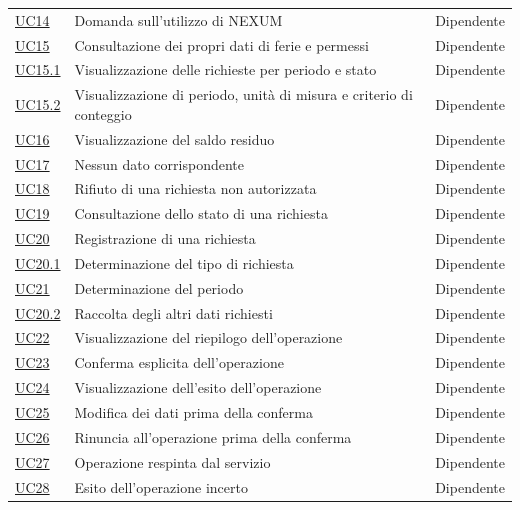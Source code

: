 \documentclass[documento]{gpt}
\begin{document}
{\begin{longtable}{@{}p{1.9cm}>{\raggedright\arraybackslash}p{8.7cm}>{\raggedright\arraybackslash}p{4.2cm}@{}}
\hyperref[uc:prodotto]{UC14} & Domanda sull'utilizzo di NEXUM & Dipendente \\
\hyperref[uc:dati]{UC15} & Consultazione dei propri dati di ferie e permessi & Dipendente \\
\hspace{1em}\hyperref[uc:dati_riep]{UC15.1} & Visualizzazione delle richieste per periodo e stato & Dipendente \\
\hspace{1em}\hyperref[uc:dati_criteri]{UC15.2} & Visualizzazione di periodo, unità di misura e criterio di conteggio & Dipendente \\
\hyperref[uc:saldo]{UC16} & Visualizzazione del saldo residuo & Dipendente \\
\hyperref[uc:nessun_dato]{UC17} & Nessun dato corrispondente & Dipendente \\
\hyperref[uc:non_aut]{UC18} & Rifiuto di una richiesta non autorizzata & Dipendente \\
\hyperref[uc:stato_rich]{UC19} & Consultazione dello stato di una richiesta & Dipendente \\
\hyperref[uc:registra]{UC20} & Registrazione di una richiesta & Dipendente \\
\hspace{1em}\hyperref[uc:reg_tipo]{UC20.1} & Determinazione del tipo di richiesta & Dipendente \\
\hyperref[uc:periodo]{UC21} & Determinazione del periodo & Dipendente \\
\hspace{1em}\hyperref[uc:reg_campi]{UC20.2} & Raccolta degli altri dati richiesti & Dipendente \\
\hyperref[uc:op_riep]{UC22} & Visualizzazione del riepilogo dell'operazione & Dipendente \\
\hyperref[uc:op_conf]{UC23} & Conferma esplicita dell'operazione & Dipendente \\
\hyperref[uc:op_esito]{UC24} & Visualizzazione dell'esito dell'operazione & Dipendente \\
\hyperref[uc:op_modifica]{UC25} & Modifica dei dati prima della conferma & Dipendente \\
\hyperref[uc:op_rinuncia]{UC26} & Rinuncia all'operazione prima della conferma & Dipendente \\
\hyperref[uc:op_rifiuto]{UC27} & Operazione respinta dal servizio & Dipendente \\
\hyperref[uc:op_incerto]{UC28} & Esito dell'operazione incerto & Dipendente \\

\end{longtable}}
\end{document}
